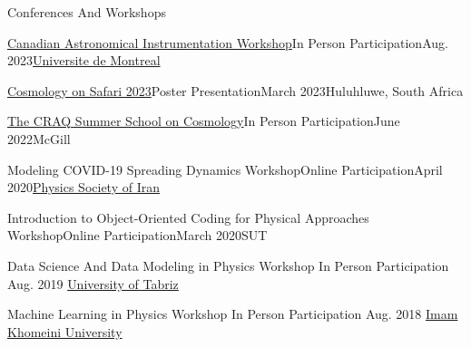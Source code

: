 \documentclass[]{kyvernitis-resume}
\begin{document}
\begin{section}{Conferences And Workshops}

\begin{subsectionnobullet}
{\href{https://exoplanetes.umontreal.ca/en/canadian-astronomical-instrumentation-workshop/}{Canadian Astronomical Instrumentation Workshop}}{In Person Participation}{Aug. 2023}{\href{https://www.umontreal.ca/}{Universite de Montreal}}
\end{subsectionnobullet}

\begin{subsectionnobullet}{\href{https://cosmosafari.co.za/}{Cosmology on Safari 2023}}{Poster Presentation}{March 2023}{Huluhluwe, South Africa}
\end{subsectionnobullet}

\begin{subsectionnobullet}
    {\href{https://craq-astro.ca/summerschool/?lang=en}{The CRAQ Summer School on Cosmology}}{In Person Participation}{June 2022}{McGill}
\end{subsectionnobullet}

\begin{subsectionnobullet}
    {Modeling COVID-19 Spreading Dynamics Workshop}{Online Participation}{April 2020}{\href{http://www.psi.ir/farsi.asp?page=dem99}{Physics Society of Iran}}
\end{subsectionnobullet}

\begin{subsectionnobullet}
    {Introduction to Object-Oriented Coding for Physical Approaches Workshop}{Online Participation}{March 2020}{SUT}
\end{subsectionnobullet}

\begin{subsectionnobullet}
    {Data Science And Data Modeling in Physics Workshop}
    {In Person Participation}
    {Aug. 2019}
    {\href{http://tabrizu.ac.ir/en}{University of Tabriz}}
\end{subsectionnobullet}

\begin{subsectionnobullet}
    {Machine Learning in Physics Workshop}
    {In Person Participation}
     {Aug. 2018}
    {\href{http://ikiu.ac.ir/en/}{Imam Khomeini University}}
\end{subsectionnobullet}

\end{section}
\end{document}

